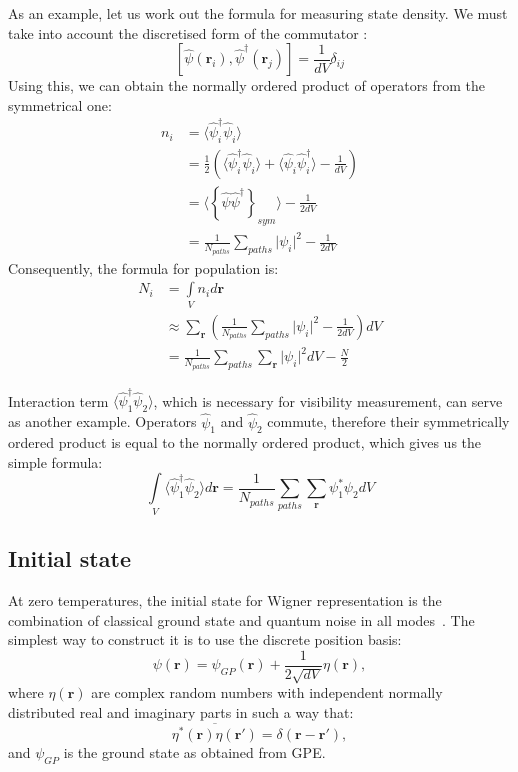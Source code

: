 \documentclass[12pt,notitlepage]{report}
\begin{document}
As an example, let us work out the formula for measuring state density.
We must take into account the discretised form of the commutator \cite{0953-4075-35-17-301}:
\[ \left[ \hat{\psi}(\mathbf{r}_i), \hat{\psi}^\dagger(\mathbf{r}_j) \right] = \frac{1}{dV} \delta_{ij} \]
Using this, we can obtain the normally ordered product of operators from the symmetrical one:
\begin{equation*}
\begin{split}
n_i & = \langle \hat{\psi}^\dagger_i \hat{\psi}_i \rangle \\
& = \frac{1}{2} \left( \langle \hat{\psi}^\dagger_i \hat{\psi}_i \rangle +
\langle \hat{\psi}_i \hat{\psi}^\dagger_i \rangle - \frac{1}{dV} \right) \\
& = \langle \left\{ \hat{\psi} \hat{\psi}^\dagger \right\}_{sym} \rangle - \frac{1}{2 dV} \\
& = \frac{1}{N_{paths}} \sum\limits_{paths} \lvert \psi_i \rvert^2 - \frac{1}{2 dV}
\end{split}
\end{equation*}
Consequently, the formula for population is:
\begin{equation*}
\begin{split}
N_i & = \int\limits_V n_i d\mathbf{r} \\
& \approx \sum\limits_\mathbf{r} \left( \frac{1}{N_{paths}} \sum\limits_{paths} \lvert \psi_i \rvert^2 - \frac{1}{2 dV} \right) dV \\
& = \frac{1}{N_{paths}} \sum\limits_{paths} \sum\limits_\mathbf{r} \lvert \psi_i \rvert^2 dV - \frac{N}{2}
\end{split}
\end{equation*}

Interaction term $\langle \hat{\psi}^\dagger_1 \hat{\psi}_2 \rangle$, which is necessary for visibility measurement,
can serve as another example. Operators $\hat{\psi}_1$ and $\hat{\psi}_2$ commute,
therefore their symmetrically ordered product is equal to the normally ordered product, which gives us the simple formula:
\[
\int\limits_V \langle \hat{\psi}^\dagger_1 \hat{\psi}_2 \rangle d\mathbf{r} =
\frac{1}{N_{paths}} \sum\limits_{paths} \sum\limits_\mathbf{r} \psi_1^* \psi_2 dV
\]

\subsection*{Initial state}

At zero temperatures, the initial state for Wigner representation
is the combination of classical ground state and quantum noise in all modes~\cite{PhysRevA.58.4824}.
The simplest way to construct it is to use the discrete position basis:
\[	
\psi(\mathbf{r}) = \psi_{GP}(\mathbf{r}) + \frac{1}{2 \sqrt{dV}} \eta(\mathbf{r}),
\]
where $\eta(\mathbf{r})$ are complex random numbers with independent normally distributed
real and imaginary parts in such a way that:
\[ \overline{\eta^*(\mathbf{r}) \eta(\mathbf{r}')} = \delta(\mathbf{r} - \mathbf{r}'), \]
and $\psi_{GP}$ is the ground state as obtained from GPE.
\end{document}
